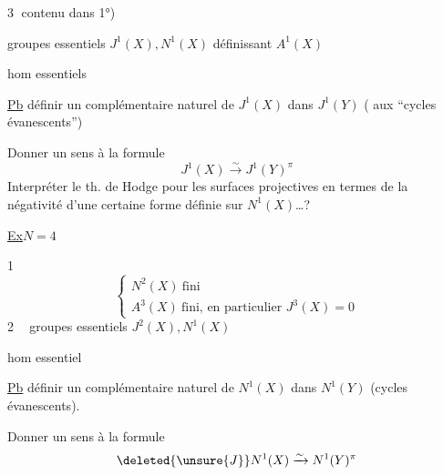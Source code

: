\textcircled{3}\quad {} contenu dans 1°)

groupes essentiels \(J^1(X),N^1(X)\) définissant \(A^1(X)\)

hom essentiels

\uline{Pb} définir un complémentaire naturel de \(J^1(X)\) dans \(J^1(Y)\) ( aux ``cycles évanescents'')

Donner un sens à la formule
\[
J^1(X)\xrightarrow{\sim}J^1(Y)^\pi
\]
Interpréter le th. de  Hodge pour les surfaces projectives en termes de la négativité d'une certaine forme définie sur \(N^1(X)\)\ldots ?

\uline{Ex}\quad \(N=4\)

\textcircled{1}\quad
\[
\left\{\begin{array}{l}N^2(X)\ \text{fini}\\A^3(X)\ \text{fini, en particulier }J^3(X)=0\end{array}\right.
\]
\textcircled{2}\quad
{}
\textcircled{}
groupes essentiels \(J^2(X),N^1(X)\)

hom essentiel

\uline{Pb} définir un complémentaire naturel de \(N^1(X)\) dans \(N^1(Y)\) (cycles évanescents). 

Donner un sens à la formule
\[
\deleted{\unsure{J}}N^1(X)\xrightarrow{\sim}N^1(Y)^\pi
\]

